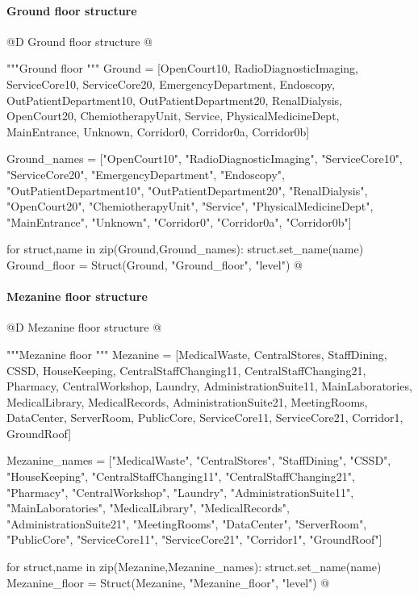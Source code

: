 \documentclass[11pt,oneside]{article}    %
\begin{document}
\paragraph{Ground floor structure}
@D Ground floor structure
@{"""Ground floor """
Ground = [OpenCourt10, RadioDiagnosticImaging,
    ServiceCore10, ServiceCore20,  EmergencyDepartment, Endoscopy,
    OutPatientDepartment10, OutPatientDepartment20, RenalDialysis,
    OpenCourt20, ChemiotherapyUnit, Service, PhysicalMedicineDept,
    MainEntrance, Unknown, Corridor0, Corridor0a, Corridor0b]
    
Ground_names = ["OpenCourt10", "RadioDiagnosticImaging",
    "ServiceCore10", "ServiceCore20", "EmergencyDepartment", "Endoscopy",
    "OutPatientDepartment10", "OutPatientDepartment20", "RenalDialysis",
    "OpenCourt20", "ChemiotherapyUnit", "Service", "PhysicalMedicineDept",
    "MainEntrance", "Unknown", "Corridor0", "Corridor0a", "Corridor0b"]

for struct,name in zip(Ground,Ground_names): struct.set_name(name)
Ground_floor = Struct(Ground, "Ground_floor", "level")
@}

\paragraph{Mezanine floor structure}
@D Mezanine floor structure
@{"""Mezanine floor """
Mezanine = [MedicalWaste, CentralStores,
    StaffDining, CSSD, HouseKeeping,  CentralStaffChanging11,
    CentralStaffChanging21, Pharmacy, CentralWorkshop, Laundry,
    AdministrationSuite11, MainLaboratories, MedicalLibrary, MedicalRecords,
    AdministrationSuite21, MeetingRooms, DataCenter, ServerRoom, PublicCore,
    ServiceCore11, ServiceCore21, Corridor1, GroundRoof]

Mezanine_names = ["MedicalWaste", "CentralStores",
    "StaffDining", "CSSD", "HouseKeeping", "CentralStaffChanging11",
    "CentralStaffChanging21", "Pharmacy", "CentralWorkshop", "Laundry",
    "AdministrationSuite11", "MainLaboratories", "MedicalLibrary", "MedicalRecords",
    "AdministrationSuite21", "MeetingRooms", "DataCenter", "ServerRoom", "PublicCore",
    "ServiceCore11", "ServiceCore21", "Corridor1", "GroundRoof"]

for struct,name in zip(Mezanine,Mezanine_names): struct.set_name(name)
Mezanine_floor = Struct(Mezanine, "Mezanine_floor", "level")
@}
\end{document}
